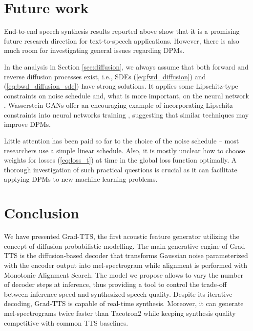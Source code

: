 \documentclass{article}
\begin{document}
\section{Future work}
\label{sec:future}

End-to-end speech synthesis results reported above show that it is a promising future research direction for text-to-speech applications. However, there is also much room for investigating general issues regarding DPMs.

In the analysis in Section \ref{sec:diffusion}, we always assume that both forward and reverse diffusion processes exist, i.e., SDEs (\ref{eq:fwd_diffusion}) and (\ref{eq:bwd_diffusion_sde}) have strong solutions. It applies some Lipschitz-type constraints \cite{SDE-book} on noise schedule  and, what is more important, on the neural network . Wasserstein GANs offer an encouraging example of incorporating Lipschitz constraints into neural networks training \cite{WGAN-GP}, suggesting that similar techniques may improve DPMs.

Little attention has been paid so far to the choice of the noise schedule  -- most researchers use a simple linear schedule. Also, it is mostly unclear how to choose weights for losses (\ref{eq:loss_t}) at time  in the global loss function optimally. A thorough investigation of such practical questions is crucial as it can facilitate applying DPMs to new machine learning problems.

\section{Conclusion}
\label{sec:conclusion}

We have presented Grad-TTS, the first acoustic feature generator utilizing the concept of diffusion probabilistic modelling. The main generative engine of Grad-TTS is the diffusion-based decoder that transforms Gaussian noise parameterized with the encoder output into mel-spectrogram while alignment is performed with Monotonic Alignment Search. The model we propose allows to vary the number of decoder steps at inference, thus providing a tool to control the trade-off between inference speed and synthesized speech quality. Despite its iterative decoding, Grad-TTS is capable of real-time synthesis. Moreover, it can generate mel-spectrograms twice faster than Tacotron2 while keeping synthesis quality competitive with common TTS baselines.



\end{document}
